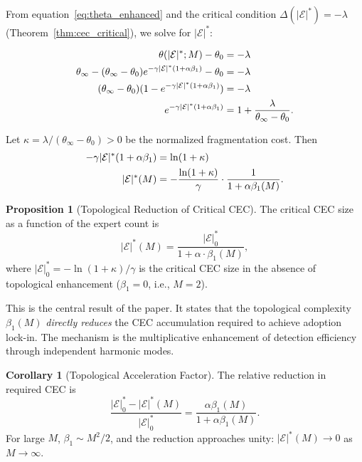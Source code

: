 \documentclass[12pt,a4paper]{article}
\theoremstyle{definition}
\newtheorem{proposition}{Proposition}[section]
\newtheorem{corollary}{Corollary}[section]
\theoremstyle{remark}
\theoremstyle{definition}
\newcommand{\CEC}{\mathcal{E}}
\newcommand{\CECstar}{|\CEC|^*}
\begin{document}
From equation~\eqref{eq:theta_enhanced} and the critical condition $\Delta(\CECstar) = -\lambda$ (Theorem~\ref{thm:cec_critical}), we solve for $\CECstar$:

\begin{align}
  \theta(\CECstar; M) - \theta_0 &= -\lambda \notag\\
  \theta_\infty - (\theta_\infty - \theta_0) e^{-\gamma \CECstar (1 + \alpha\beta_1)} - \theta_0 &= -\lambda \notag\\
  (\theta_\infty - \theta_0)(1 - e^{-\gamma \CECstar (1 + \alpha\beta_1)}) &= -\lambda \notag\\
  e^{-\gamma \CECstar (1 + \alpha\beta_1)} &= 1 + \frac{\lambda}{\theta_\infty - \theta_0}.
\end{align}

Let $\kappa = \lambda/(\theta_\infty - \theta_0) > 0$ be the normalized fragmentation cost. Then
\begin{align}
  -\gamma \CECstar (1 + \alpha\beta_1) &= \ln(1 + \kappa) \notag\\
  \CECstar(M) &= -\frac{\ln(1+\kappa)}{\gamma} \cdot \frac{1}{1 + \alpha\beta_1(M)}.
\end{align}

\begin{proposition}[Topological Reduction of Critical CEC]\label{prop:cec_reduction}
  The critical CEC size as a function of the expert count is
  \begin{equation}\label{eq:cec_star_formula}
    \CECstar(M) = \frac{\CECstar_0}{1 + \alpha \cdot \beta_1(M)},
  \end{equation}
  where $\CECstar_0 = -\ln(1+\kappa)/\gamma$ is the critical CEC size in the absence of topological enhancement ($\beta_1 = 0$, i.e., $M=2$).
\end{proposition}

This is the central result of the paper. It states that the topological complexity $\beta_1(M)$ \emph{directly reduces} the CEC accumulation required to achieve adoption lock-in. The mechanism is the multiplicative enhancement of detection efficiency through independent harmonic modes.

\begin{corollary}[Topological Acceleration Factor]\label{cor:acceleration}
  The relative reduction in required CEC is
  \begin{equation}
    \frac{\CECstar_0 - \CECstar(M)}{\CECstar_0} = \frac{\alpha\beta_1(M)}{1 + \alpha\beta_1(M)}.
  \end{equation}
  For large $M$, $\beta_1 \sim M^2/2$, and the reduction approaches unity: $\CECstar(M) \to 0$ as $M \to \infty$.
\end{corollary}
\end{document}

